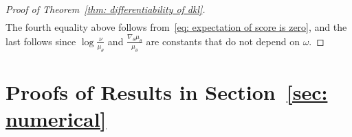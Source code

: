 \documentclass[reqno]{amsart}
\newcommand{\1}{\mathds{1}}
\renewcommand{\d}{\mathrm{d}}
\newcommand{\grad}{\nabla}
\renewcommand{\P}{\mathds{P}}
\DeclareMathOperator{\cov}{cov}
\theoremstyle{definition}
\theoremstyle{remark}
\begin{document}
\begin{proof}[Proof of Theorem~\ref{thm: differentiability of dkl}]
\begin{align*}
  \end{align*}
  The fourth equality above follows from~\eqref{eq: expectation of score is zero}, and the last follows since $\log \frac{\nu}{\mu_\theta}$ and $\frac{\grad_\theta \mu_\theta}{\mu_\theta}$ are constants that do not depend on $\omega$.
\end{proof}
\section{Proofs of Results in Section~\ref{sec: numerical}}
\label{apx: proofs for numerics section}
\end{document}

